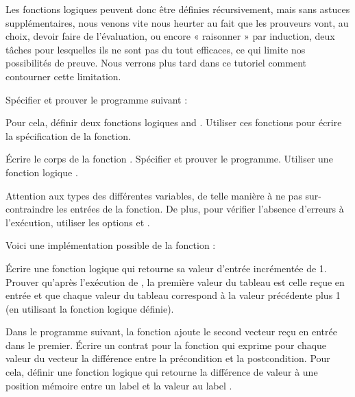 Les fonctions logiques peuvent donc être définies récursivement, mais sans astuces
supplémentaires, nous venons vite nous heurter au fait que les prouveurs vont, au
choix, devoir faire de l'évaluation, ou encore « raisonner » par induction, deux
tâches pour lesquelles ils ne sont pas du tout efficaces, ce qui limite nos
possibilités de preuve. Nous verrons plus tard dans ce tutoriel comment contourner
cette limitation.






Spécifier et prouver le programme suivant :




Pour cela, définir deux fonctions logiques  and .
Utiliser ces fonctions pour écrire la spécification de la fonction.






Écrire le corps de la fonction . Spécifier et prouver le
programme. Utiliser une fonction logique .




Attention aux types des différentes variables, de telle manière à ne pas
sur-contraindre les entrées de la fonction. De plus, pour vérifier l'absence
d'erreurs à l'exécution, utiliser les options 
et .






Voici une implémentation possible de la fonction  :




Écrire une fonction logique qui retourne sa valeur d'entrée incrémentée de 1.
Prouver qu'après l'exécution de , la première valeur du tableau
est celle reçue en entrée et que chaque valeur du tableau correspond à la valeur
précédente plus 1 (en utilisant la fonction logique définie).







Dans le programme suivant, la fonction  ajoute le second
vecteur reçu en entrée dans le premier. Écrire un contrat pour la fonction
 qui exprime pour chaque valeur du vecteur
 la différence entre la précondition et la postcondition. Pour cela,
définir une fonction logique  qui retourne la différence de
valeur à une position mémoire entre un label  et la valeur au
label .




